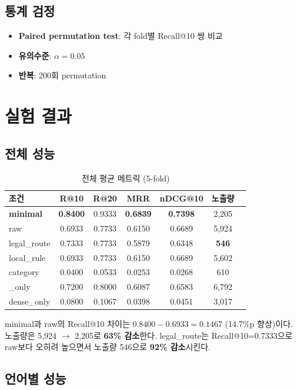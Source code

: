 \documentclass[11pt,a4paper]{article}
\begin{document}
\subsection{통계 검정}
\begin{itemize}
\item \textbf{Paired permutation test}: 각 fold별 Recall@10 쌍 비교
\item \textbf{유의수준}: $\alpha=0.05$
\item \textbf{반복}: 200회 permutation
\end{itemize}

\section{실험 결과}
\label{sec:results}

\subsection{전체 성능}
\begin{table}[h]
\centering
\caption{전체 평균 메트릭 (5-fold)}
\begin{tabular}{lcccccc}
\toprule
조건 & R@10 & R@20 & MRR & nDCG@10 & 노출량 \\
\midrule
\textbf{minimal} & \textbf{0.8400} & 0.9333 & \textbf{0.6839} & \textbf{0.7398} & 2,205 \\
raw & 0.6933 & 0.7733 & 0.6150 & 0.6689 & 5,924 \\
legal\_route & 0.7333 & 0.7733 & 0.5879 & 0.6348 & \textbf{546} \\
local\_rule & 0.6933 & 0.7733 & 0.6150 & 0.6689 & 5,602 \\
category & 0.0400 & 0.0533 & 0.0253 & 0.0268 & 610 \\
\bm25\_only & 0.7200 & 0.8000 & 0.6087 & 0.6583 & 6,792 \\
dense\_only & 0.0800 & 0.1067 & 0.0398 & 0.0451 & 3,017 \\
\bottomrule
\end{tabular}
\end{table}

minimal과 raw의 Recall@10 차이는 $0.8400 - 0.6933 = 0.1467$ (14.7\%p 향상)이다. 노출량은 5,924 $\to$ 2,205로 \textbf{63\% 감소}한다. legal\_route는 Recall@10=0.7333으로 raw보다 오히려 높으면서 노출량 546으로 \textbf{92\% 감소}시킨다.

\subsection{언어별 성능}
\end{document}
